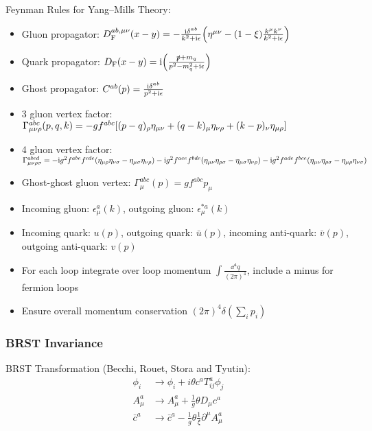 		\noindent
		Feynman Rules for Yang--Mills Theory:
		\begin{itemize}\itemsep -0pt
			\item Gluon propagator: $D_\text{F}^{ab,\mu\nu}(x-y) = -\frac{\mathrm{i} \delta^{ab}}{k^2+\mathrm{i}\epsilon} \qty(\eta^{\mu\nu}-(1-\xi)\frac{k^\mu k^\nu}{k^2+\mathrm{i}\epsilon} )$
			\item Quark propagator: $D_\text{F}(x-y) = \mathrm{i}\qty(\frac{\slashed{p}+m_q}{p^2-m_q^2+\mathrm{i}\epsilon})$
			\item Ghost propagator: $C^{ab}(p) = \frac{\mathrm{i}\delta^{ab}}{p^2+\mathrm{i}\epsilon}$
			\item 3 gluon vertex factor: $\Gamma^{abc}_{\mu\nu\rho}(p,q,k) = -gf^{abc} \qty[(p-q)_\rho \eta_{\mu\nu} + (q-k)_\mu \eta_{\nu\rho} + (k-p)_\nu \eta_{\mu\rho}]$
			\item 4 gluon vertex factor: $\Gamma^{abcd}_{\mu\nu\rho\sigma} = -\mathrm{i} g^2 f^{abe}f^{cde}(\eta_{\mu\rho}\eta_{\nu\sigma} - \eta_{\mu\sigma}\eta_{\nu\rho}) - \mathrm{i} g^2 f^{ace}f^{bde} (\eta_{\mu\nu}\eta_{\rho\sigma} - \eta_{\mu\sigma}\eta_{\nu\rho}) - \mathrm{i} g^2 f^{ade} f^{bce} (\eta_{\mu\nu}\eta_{\rho\sigma} - \eta_{\mu\rho}\eta_{\nu\sigma})$
			\item Ghost-ghost gluon vertex: $\Gamma^{abc}_\mu(p) = gf^{abc} p_\mu$
			\item Incoming gluon: $\epsilon^a_\mu(k)$, outgoing gluon: $\epsilon^{*a}_\mu(k)$
			\item Incoming quark: $u(p)$, outgoing quark: $\bar{u}(p)$, incoming anti-quark: $\bar{v}(p)$, outgoing anti-quark: $v(p)$
			\item For each loop integrate over loop momentum $\int \frac{\dd^4 q}{(2\pi)^4}$, include a minus for fermion loops
			\item Ensure overall momentum conservation $(2\pi)^4 \delta(\sum_i p_i)$
		\end{itemize}

		\subsubsection{BRST Invariance}
			BRST Transformation (Becchi, Rouet, Stora and Tyutin):
			\begin{equation}
				\begin{aligned}
					\phi_i & \to \phi_i + i\theta c^a T^a_{ij} \phi_j \\
					A^a_\mu & \to A^a_\mu + \frac{1}{g}\theta D_\mu c^a \\
					\bar{c}^a & \to \bar{c}^a - \frac{1}{g} \theta \frac{1}{\xi} \partial^\mu A^a_\mu \\
				\end{aligned}
			\end{equation}


